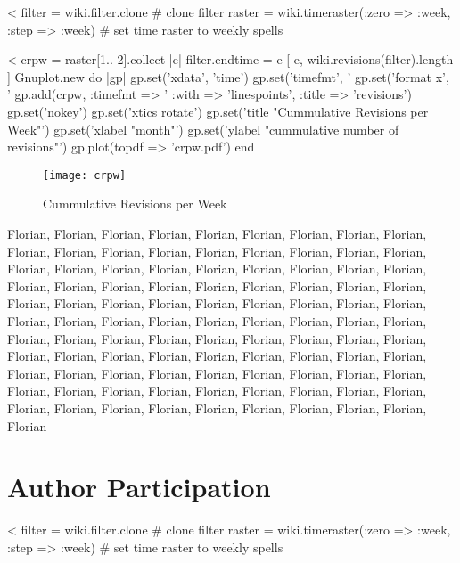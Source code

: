 \documentclass{scrartcl}
\begin{document}
<%
filter = wiki.filter.clone # clone filter
raster = wiki.timeraster(:zero => :week, :step => :week) # set time raster to weekly spells

<%
crpw = raster[1..-2].collect { |e| filter.endtime = e 
	[ e, wiki.revisions(filter).length ]
	}
Gnuplot.new do |gp|
	gp.set('xdata', 'time')
	gp.set('timefmt', '%
	gp.set('format x', '%
	gp.add(crpw, :timefmt => '%
		:with => 'linespoints', 
		:title => 'revisions')
	gp.set('nokey')
	gp.set('xtics rotate')
	gp.set('title "Cummulative Revisions per Week"')
	gp.set('xlabel "month"')
	gp.set('ylabel "cummulative number of revisions"')
	gp.plot(topdf => 'crpw.pdf')
end
\begin{figure}[htbp]
	\centering
	\texttt{[image: crpw]}
	\caption{Cummulative Revisions per Week}
	\label{fig:cummulative_revisions_per_week}
\end{figure}

Florian, Florian, Florian, Florian, Florian, Florian, Florian, Florian, Florian, Florian, Florian, Florian, Florian, Florian, Florian, Florian, Florian, Florian, Florian, Florian, Florian, Florian, Florian, Florian, Florian, Florian, Florian, Florian, Florian, Florian, Florian, Florian, Florian, Florian, Florian, Florian, Florian, Florian, Florian, Florian, Florian, Florian, Florian, Florian, Florian, Florian, Florian, Florian, Florian, Florian, Florian, Florian, Florian, Florian, Florian, Florian, Florian, Florian, Florian, Florian, Florian, Florian, Florian, Florian, Florian, Florian, Florian, Florian, Florian, Florian, Florian, Florian, Florian, Florian, Florian, Florian, Florian, Florian, Florian, Florian, Florian, Florian, Florian, Florian, Florian, Florian, Florian, Florian, Florian, Florian, Florian, Florian, Florian, Florian, Florian, Florian, Florian, Florian, Florian, Florian


\section{Author Participation} %
\label{sec:author_participation}

<%
filter = wiki.filter.clone # clone filter
raster = wiki.timeraster(:zero => :week, :step => :week) # set time raster to weekly spells
\end{document}
